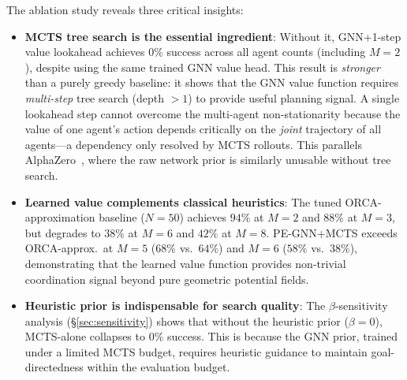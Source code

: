 \documentclass[11pt,a4paper]{article}
\begin{document}
The ablation study reveals three critical insights:
\begin{itemize}
    \item \textbf{MCTS tree search is the essential ingredient}: Without it, GNN+1-step value lookahead achieves $0\%$ success across all agent counts (including $M=2$), despite using the same trained GNN value head. This result is \emph{stronger} than a purely greedy baseline: it shows that the GNN value function requires \emph{multi-step} tree search (depth $> 1$) to provide useful planning signal. A single lookahead step cannot overcome the multi-agent non-stationarity because the value of one agent's action depends critically on the \emph{joint} trajectory of all agents---a dependency only resolved by MCTS rollouts. This parallels AlphaZero~\cite{silver2017mastering}, where the raw network prior is similarly unusable without tree search.
    \item \textbf{Learned value complements classical heuristics}: The tuned ORCA-approximation baseline ($N=50$) achieves $94\%$ at $M=2$ and $88\%$ at $M=3$, but degrades to $38\%$ at $M=6$ and $42\%$ at $M=8$. PE-GNN+MCTS exceeds ORCA-approx.\ at $M=5$ ($68\%$ vs.\ $64\%$) and $M=6$ ($58\%$ vs.\ $38\%$), demonstrating that the learned value function provides non-trivial coordination signal beyond pure geometric potential fields.
    \item \textbf{Heuristic prior is indispensable for search quality}: The $\beta$-sensitivity analysis (\S\ref{sec:sensitivity}) shows that without the heuristic prior ($\beta=0$), MCTS-alone collapses to $0\%$ success. This is because the GNN prior, trained under a limited MCTS budget, requires heuristic guidance to maintain goal-directedness within the evaluation budget.
\end{itemize}
\end{document}
